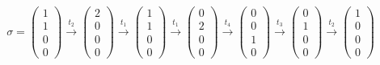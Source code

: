 \documentclass[12pt,a4paper]{../krautsourcing/homework}
\newcommand{\cvec}[1]{\begin{pmatrix}#1\end{pmatrix}}
\begin{document}
\subsection{}

\begin{align*}
	\sigma = \cvec{1\\1\\0\\0} 
	\xrightarrow{t_2} \cvec{2\\0\\0\\0}
	\xrightarrow{t_1} \cvec{1\\1\\0\\0}
	\xrightarrow{t_1} \cvec{0\\2\\0\\0}
	\xrightarrow{t_4} \cvec{0\\0\\1\\0}
	\xrightarrow{t_3} \cvec{0\\1\\0\\0}
	\xrightarrow{t_2} \cvec{1\\0\\0\\0}
\end{align*}

\newpage

\subsection{}
\end{document}
